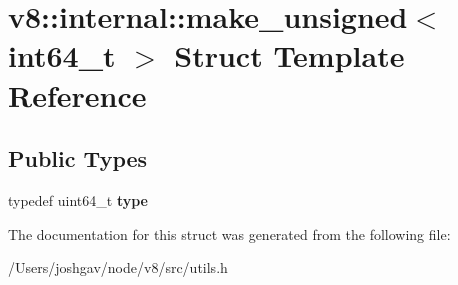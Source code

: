 \hypertarget{structv8_1_1internal_1_1make__unsigned_3_01int64__t_01_4}{}\section{v8\+:\+:internal\+:\+:make\+\_\+unsigned$<$ int64\+\_\+t $>$ Struct Template Reference}
\label{structv8_1_1internal_1_1make__unsigned_3_01int64__t_01_4}
\subsection*{Public Types}
\begin{DoxyCompactItemize}
\item 
typedef uint64\+\_\+t {\bfseries type}\hypertarget{structv8_1_1internal_1_1make__unsigned_3_01int64__t_01_4_a8a940b55343f0566bfe7003868e11693}{}\label{structv8_1_1internal_1_1make__unsigned_3_01int64__t_01_4_a8a940b55343f0566bfe7003868e11693}

\end{DoxyCompactItemize}


The documentation for this struct was generated from the following file\+:\begin{DoxyCompactItemize}
\item 
/\+Users/joshgav/node/v8/src/utils.\+h\end{DoxyCompactItemize}
